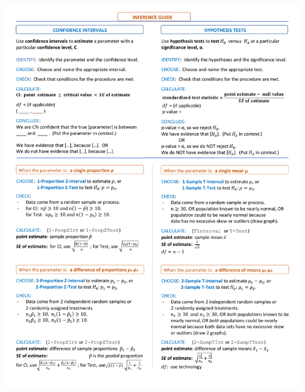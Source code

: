 
\begin{center}
\includegraphics[height=10in]{extraTeX/inferenceGuide/figures/inference_guide1}


\end{center}
